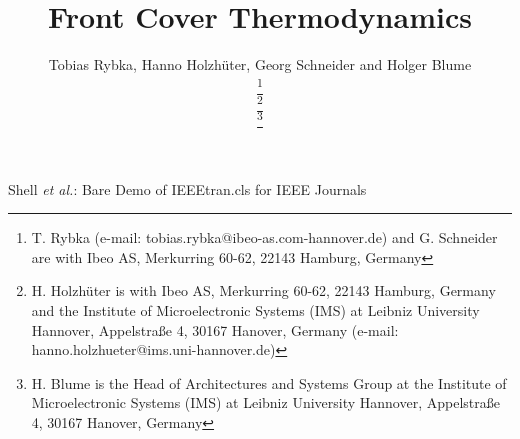 \documentclass[journal]{IEEEtran} %
\begin{document}


\title{Front Cover Thermodynamics}


\author{Tobias Rybka, Hanno Holzh{\"u}ter, Georg Schneider and Holger Blume%


\thanks{T. Rybka (e-mail: tobias.rybka@ibeo-as.com-hannover.de) and G.
Schneider are with Ibeo AS, Merkurring 60-62, 22143 Hamburg, Germany}%

\thanks{H. Holzh{\"u}ter is with Ibeo AS, Merkurring 60-62, 22143 Hamburg,
Germany and the Institute of Microelectronic Systems (IMS) at Leibniz
University Hannover, Appelstraße 4, 30167 Hanover, Germany (e-mail:
hanno.holzhueter@ims.uni-hannover.de)}%


\thanks{H. Blume is the Head of Architectures and Systems Group at the
Institute of Microelectronic Systems (IMS) at Leibniz University Hannover,
Appelstraße 4, 30167 Hanover, Germany}%
}

{Shell \MakeLowercase{\textit{et al.}}: Bare Demo of IEEEtran.cls for IEEE Journals}
\maketitle
\end{document}
